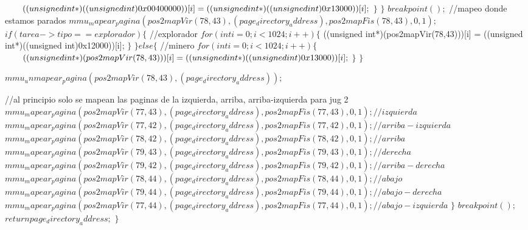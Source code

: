 \begin{algorithmic}
        \State \tab \tab \tab \tab $  \hspace*{7mm} ((unsigned int*)((unsigned int)0x00400000))[i] = ((unsigned int*)((unsigned int)0x13000))[i];$
      \State \tab \tab \tab \tab $ \}$
    \State \tab \tab \tab $ \}$
  \State \tab \tab \tab $   breakpoint();$
    //mapeo donde estamos parados
  \State \tab \tab \tab $   mmu_mapear_pagina(pos2mapVir(78,43), (page_directory_address), pos2mapFis(78,43), 0, 1);$
  \State \tab \tab \tab $   if (tarea->tipo == explorador) \{$
      //explorador
     \State \tab \tab \tab \tab $  for (int i = 0; i < 1024; i++) \{$
        ((unsigned int*)(pos2mapVir(78,43)))[i] = ((unsigned int*)((unsigned int)0x12000))[i];
      \State \tab \tab \tab \tab $ \}$
  \State \tab \tab \tab $  \} else \{$
      //minero
     \State \tab \tab \tab \tab $  for (int i = 0; i < 1024; i++) \{$
       \State \tab \tab \tab \tab $  \hspace*{7mm} ((unsigned int*)(pos2mapVir(78,43)))[i] = ((unsigned int*)((unsigned int)0x13000))[i];$
    \State \tab \tab \tab \tab $   \}$
  \State \tab \tab \tab $   \}$

  \State \tab \tab \tab $   mmu_unmapear_pagina(pos2mapVir(78,43), (page_directory_address));$

    //al principio solo se mapean las paginas de la izquierda, arriba, arriba-izquierda para jug 2
  \State \tab \tab \tab $   mmu_mapear_pagina(pos2mapVir(77,43), (page_directory_address), pos2mapFis(77,43), 0, 1);//izquierda$
  \State \tab \tab \tab $   mmu_mapear_pagina(pos2mapVir(77,42), (page_directory_address), pos2mapFis(77,42), 0, 1);//arriba-izquierda$
  \State \tab \tab \tab $   mmu_mapear_pagina(pos2mapVir(78,42), (page_directory_address), pos2mapFis(78,42), 0, 1);//arriba$
  \State \tab \tab \tab $   mmu_mapear_pagina(pos2mapVir(79,43), (page_directory_address), pos2mapFis(79,43), 0, 1);//derecha$
  \State \tab \tab \tab $   mmu_mapear_pagina(pos2mapVir(79,42), (page_directory_address), pos2mapFis(79,42), 0, 1);//arriba-derecha$
  \State \tab \tab \tab $   mmu_mapear_pagina(pos2mapVir(78,44), (page_directory_address), pos2mapFis(78,44), 0, 1);//abajo$
  \State \tab \tab \tab $   mmu_mapear_pagina(pos2mapVir(79,44), (page_directory_address), pos2mapFis(79,44), 0, 1);//abajo-derecha$
  \State \tab \tab \tab $   mmu_mapear_pagina(pos2mapVir(77,44), (page_directory_address), pos2mapFis(77,44), 0, 1);//abajo-izquierda$
\State \tab \tab $  \}$
\State \tab \tab  $ breakpoint();$
\State \tab \tab  $ return page_directory_address;$
\State \tab $ \}$
\end{algorithmic}


